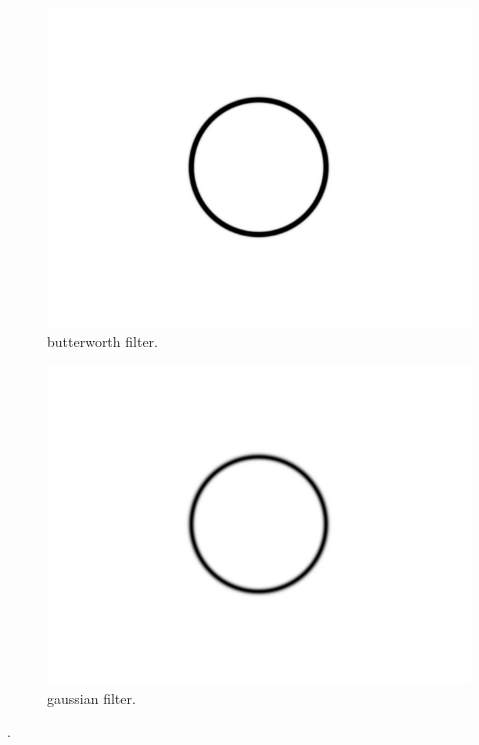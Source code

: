 \documentclass[14pt]{article}
\begin{document}
				\begin{figure}[hbt!]
					\centering
					\includegraphics[width=0.9\linewidth]{btw.png}
					\caption{butterworth filter.}
				\end{figure}
				\begin{figure}[hbt!]
					\centering
					\includegraphics[width=0.9\linewidth]{gaussian.png}
					\caption{gaussian filter.}
			\end{figure}
		.~
\end{document}
